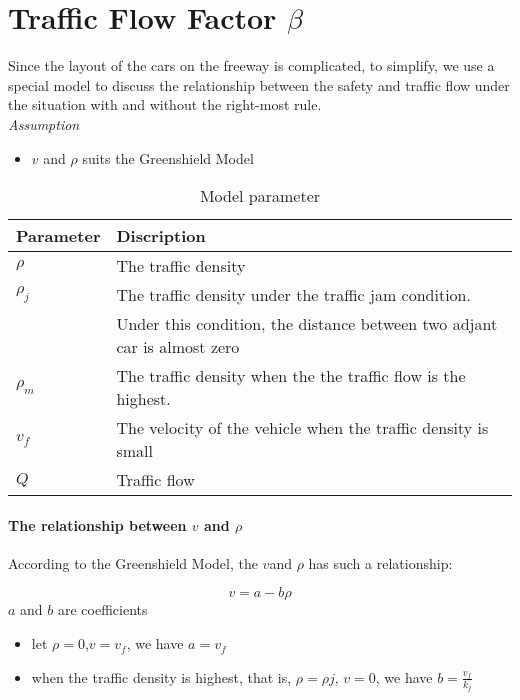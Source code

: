 \section{Traffic Flow Factor $ \beta $}
\label{sec: Traffic Flow Factor}

Since the layout of the cars on the freeway is complicated, 
to simplify, we use a special model to discuss the 
relationship between the safety and traffic flow under the 
situation with and without the right-most rule.
\\
\emph{Assumption}
\begin{itemize}
\item $v$ and $\rho$ suits the Greenshield Model
\end{itemize}

\begin{table}
\centering
\begin{tabular}{ll}
\hline
Parameter & Discription\\
\hline
$\rho $ & The traffic density\\
$\rho_j$ & The traffic density under the traffic jam condition. \\
&Under this condition, the distance between two adjant car is almost zero\\
$\rho_m$ & The traffic density when the the traffic flow is the highest.\\
$v_f$ & The velocity of the vehicle when the traffic density is small \\
$Q$ & Traffic flow \\
\hline
\end{tabular}
\caption{Model parameter}
\end{table}


\paragraph{The relationship between $v$ and $\rho$ }
According to the Greenshield Model, the $v $and $\rho$ has such a 
relationship:

\begin{equation}
v = a - b\rho
\end{equation}
$a$ and $b$ are coefficients

\begin{itemize}
\item let $\rho = 0$,$v = v_f$,
we have $a = v_f$
\\
\item when the traffic density is highest, that is,
$\rho = \rho j$, $v = 0$,
we have $b = \frac{v_f}{k_j}$
\end{itemize}


